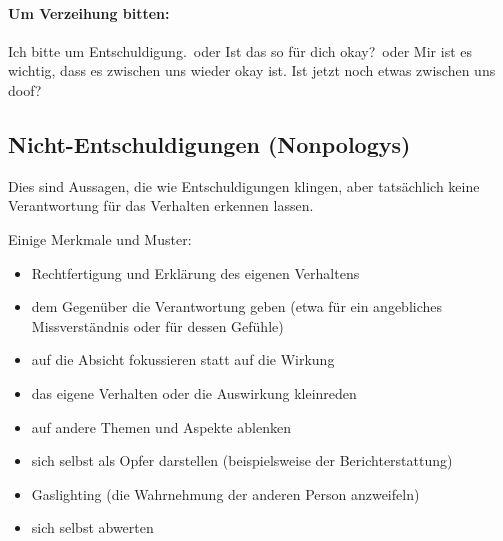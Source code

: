 \paragraph{Um Verzeihung bitten:} \glqq Ich bitte um Entschuldigung.\grqq\ oder \glqq Ist das so für dich okay?\grqq\ oder \glqq Mir ist es wichtig, dass es zwischen uns wieder okay ist. Ist jetzt noch etwas zwischen uns doof?\grqq


\subsection{Nicht-Entschuldigungen (Nonpologys)}

Dies sind Aussagen, die wie Entschuldigungen klingen, aber tatsächlich keine Verantwortung für das Verhalten erkennen lassen.

Einige Merkmale und Muster:

\begin{itemize}
  \item Rechtfertigung und Erklärung des eigenen Verhaltens
  \item dem Gegenüber die Verantwortung geben (etwa für ein angebliches Missverständnis oder für dessen Gefühle)
  \item auf die Absicht fokussieren statt auf die Wirkung
  \item das eigene Verhalten oder die Auswirkung kleinreden
  \item auf andere Themen und Aspekte ablenken
  \item sich selbst als Opfer darstellen (beispielsweise der Berichterstattung)
  \item Gaslighting (die Wahrnehmung der anderen Person anzweifeln)
  \item sich selbst abwerten
\end{itemize}
